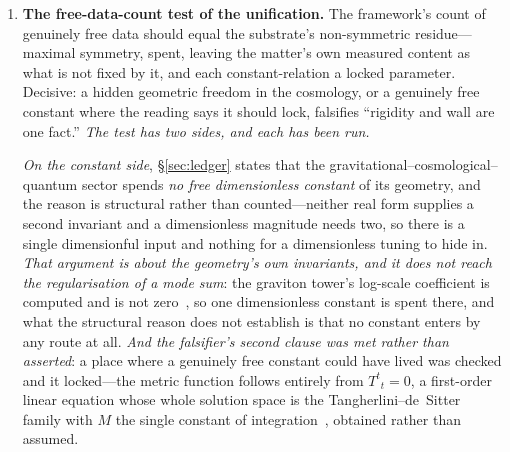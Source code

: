 \documentclass[11pt,a4paper]{article}
\theoremstyle{definition}
\begin{document}
\begin{enumerate}
\item \textbf{The free-data-count test of the unification.} The framework's count of genuinely free data
should equal the substrate's non-symmetric residue---maximal symmetry, spent, leaving the matter's own measured content as what is not fixed by it, and each constant-relation a locked parameter. Decisive: a hidden geometric freedom in the cosmology, or a genuinely
free constant where the reading says it should lock, falsifies ``rigidity and wall are one fact.''
\emph{The test has two sides, and each has been run.}

\emph{On the constant side}, \S\ref{sec:ledger} states that the gravitational--cosmological--quantum sector
spends \emph{no free dimensionless constant} of its geometry, and the reason is structural rather than
counted---neither real form supplies a second invariant and a dimensionless magnitude needs
two, so there is a single dimensionful input and nothing for a
dimensionless tuning to hide in. \emph{That argument is about the geometry's own invariants, and it does not
reach the regularisation of a mode sum}: the graviton tower's log-scale coefficient is computed and is not
zero~\cite{JanzenCanonicalTime}, so one dimensionless constant is spent there, and what the structural
reason does not establish is that no constant enters by any route at all. \emph{And the falsifier's second
clause was met rather than asserted}: a place where a genuinely free constant could have lived was checked and
it locked---the metric function follows entirely from $T^{t}{}_{t}=0$, a first-order linear equation whose
whole solution space is the Tangherlini--de~Sitter family with $M$ the single constant of
integration~\cite{JanzenSlicing}, obtained rather than assumed.


\end{enumerate}
\end{document}
